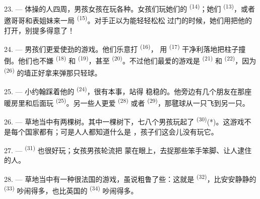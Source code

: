 \VUsaut{4.6mm}
\VUsaut{3.0mm}

23. --- 体操的人四周，男孩女孩在玩各种。女孩们玩她们的
 \textsuperscript{(14)}；她们 \textsuperscript{(13)}，或者
邀哥哥和表姐妹来一局 \textsuperscript{(15)}。对手正以为能轻轻松松
过门的时候，她们用把他的打开，别提多得意了！

24. --- 男孩们更爱使劲的游戏。他们乐意打 \textsuperscript{(16)}，
用 \textsuperscript{(17)} 干净利落地把柱子撞倒。他们也不嫌
 \textsuperscript{(18)} 和 \textsuperscript{(19)}，甚至
 \textsuperscript{(20)}。不过他们最爱的游戏是
\textsuperscript{(21)} 和 \textsuperscript{(22)}，因为
\textsuperscript{(26)} 的墙正好拿来弹那只轻球。

25. --- 小约翰踩着他的 \textsuperscript{(24)}，很有本事，站得
稳稳的。他旁边有几个朋友在那座暖房里和后面玩
\textsuperscript{(25)}。另一些人更爱 \textsuperscript{(28)} 或者
 \textsuperscript{(29)}，那毽球从一只飞到另一只。


26. --- 草地当中有两棵树。其中一棵树下，七八个男孩玩起了
\textsuperscript{(30)}(*)。这游戏不是每个国家都有；可是人人都知道什么是
，孩子们这会儿没有玩它。

\VUsaut{5.0mm}
\VUsaut{3.4mm}

27. ---  \textsuperscript{(31)} 也很好玩；女孩男孩轮流把
蒙在眼上，去捉那些笨手笨脚、让人逮住的人。

28. --- 草地当中有一种很法国的游戏，虽说粗鲁了些：这就是
 \textsuperscript{(32)}，比安安静静的 \textsuperscript{(33)}
吵闹得多，也比英国的 \textsuperscript{(34)} 吵闹得多。

